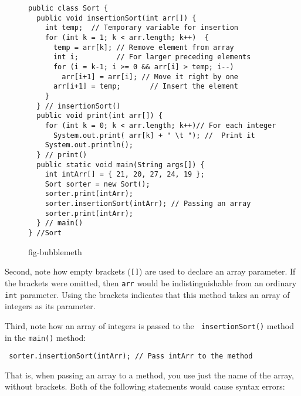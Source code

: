 \begin{figure}[bth]
\jjjprogstart
\begin{jjjlisting}
\begin{lstlisting}
public class Sort {
  public void insertionSort(int arr[]) {
    int temp;  // Temporary variable for insertion
    for (int k = 1; k < arr.length; k++)  { 
      temp = arr[k]; // Remove element from array
      int i;         // For larger preceding elements
      for (i = k-1; i >= 0 && arr[i] > temp; i--) 
        arr[i+1] = arr[i]; // Move it right by one
      arr[i+1] = temp;       // Insert the element
    }
  } // insertionSort()
  public void print(int arr[]) {
    for (int k = 0; k < arr.length; k++)// For each integer
      System.out.print( arr[k] + " \t "); //  Print it
    System.out.println();
  } // print()
  public static void main(String args[]) {
    int intArr[] = { 21, 20, 27, 24, 19 };
    Sort sorter = new Sort();
    sorter.print(intArr);
    sorter.insertionSort(intArr); // Passing an array
    sorter.print(intArr);
  } // main()
} //Sort
\end{lstlisting}
\end{jjjlisting}
{fig-bubblemeth}
\end{figure}

Second, note how empty brackets ({\tt []}) are used to
 declare an array parameter.  If the
brackets were omitted, then {\tt arr} would be indistinguishable from
an ordinary {\tt int} parameter.  Using the brackets indicates that
this method takes an array of integers as its parameter.


Third, note how an array of integers is passed to the {\tt
insertionSort()} method in the {\tt main()} method:

\begin{jjjlisting}
\begin{lstlisting}
 sorter.insertionSort(intArr); // Pass intArr to the method
\end{lstlisting}
\end{jjjlisting}

\noindent That is, when passing an array to a method, you use just the
name of the array, without brackets. Both of the following statements
would cause syntax errors:

